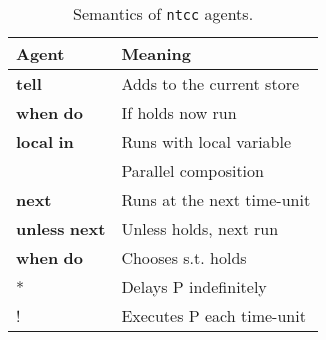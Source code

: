 \documentclass[english]{llncs}
\begin{document}
\begin{table}[!h]
  \begin{center}   
     \begin{tabular}{|ll|}
\hline
Agent & Meaning\\
\hline
\textbf{tell}  & Adds  to the current store\\
\textbf{when}  \textbf{do}   & If  holds now run \\
\textbf{local}  \textbf{in}   & Runs  with local variable \\
   & Parallel composition \\
\textbf{next}  & Runs   at the next time-unit \\
\textbf{unless}  \textbf{next}   & Unless  holds, next run  \\
 \textbf{when}  \textbf{do}   & Chooses   s.t.  holds \\ * & Delays P indefinitely \\ ! & Executes P each time-unit\\
\hline
\end{tabular}    
    \caption{Semantics of \texttt{ntcc} agents.}
    \label{tab:ntccagents}
  \end{center}
\end{table}
\end{document}
